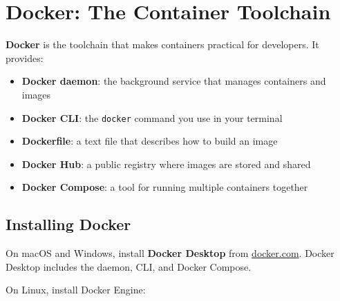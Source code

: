 \setcounter{section}{1}
\section{Docker: The Container Toolchain}\label{18-containerization:182-docker-the-container-toolchain}

\textbf{Docker} is the toolchain that makes containers practical for developers. It provides:

\begin{itemize}
\tightlist
\item
  \textbf{Docker daemon}: the background service that manages containers and images
\item
  \textbf{Docker CLI}: the \texttt{docker} command you use in your terminal
\item
  \textbf{Dockerfile}: a text file that describes how to build an image
\item
  \textbf{Docker Hub}: a public registry where images are stored and shared
\item
  \textbf{Docker Compose}: a tool for running multiple containers together
\end{itemize}

\subsection*{Installing Docker}\label{18-containerization:installing-docker}

On macOS and Windows, install \textbf{Docker Desktop} from \href{https://docker.com}{docker.com}. Docker Desktop includes the daemon, CLI, and Docker Compose.

On Linux, install Docker Engine:

\begin{codebox}[short]

\begin{Shaded}
\begin{Highlighting}[]
  
\end{Highlighting}
\end{Shaded}

\end{codebox}

